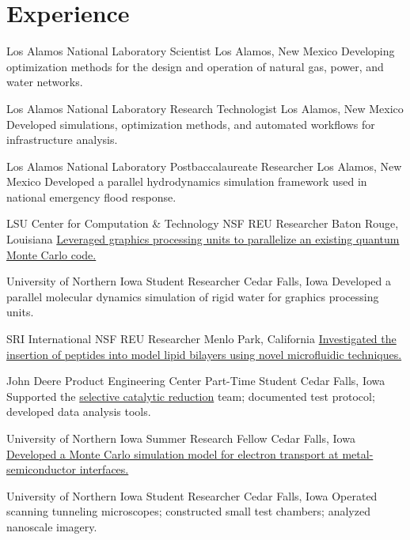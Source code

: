 \section{Experience}
		{Los Alamos National Laboratory}
		{Scientist}
		{Los Alamos, New Mexico}{}
		{Developing optimization methods for the design and operation of natural gas, power, and water networks.}

		{Los Alamos National Laboratory}
		{Research Technologist}
		{Los Alamos, New Mexico}{}
		{Developed simulations, optimization methods, and automated workflows for infrastructure analysis.}

		{Los Alamos National Laboratory}
		{Postbaccalaureate Researcher}
		{Los Alamos, New Mexico}{}
		{Developed a parallel hydrodynamics simulation framework used in national emergency flood response.}

		{LSU Center for Computation \& Technology}
		{NSF REU Researcher}
		{Baton Rouge, Louisiana}{}
		{\href{http://www.institute.loni.org/lasigma/package/vmc/}{Leveraged graphics processing units to parallelize an existing quantum Monte Carlo code.}}

		{University of Northern Iowa}
		{Student Researcher}
		{Cedar Falls, Iowa}{}
		{Developed a parallel molecular dynamics simulation of rigid water for graphics processing units.}

		{SRI International}
		{NSF REU Researcher}
		{Menlo Park, California}{}
		{\href{https://www.sri.com/wp-content/uploads/2019/12/sri-reu-2011-2.pdf}{Investigated the insertion of peptides into model lipid bilayers using novel microfluidic techniques.}}

		{John Deere Product Engineering Center}
		{Part-Time Student}
		{Cedar Falls, Iowa}{}
		{Supported the \href{https://www.deere.com/en/campaigns/engines-and-drivetrain/diesel-engine-technology}{selective catalytic reduction} team; documented test protocol; developed data analysis tools.}

		{University of Northern Iowa}
		{Summer Research Fellow}
		{Cedar Falls, Iowa}{}
		{\href{http://byron.tasseff.com/documents/reports/2010-ballistic_transport_at_metal_semiconductor_interfaces.pdf}{Developed a Monte Carlo simulation model for electron transport at metal-semiconductor interfaces.}}

		{University of Northern Iowa}
		{Student Researcher}
		{Cedar Falls, Iowa}{}
		{Operated scanning tunneling microscopes; constructed small test chambers; analyzed nanoscale imagery.}
